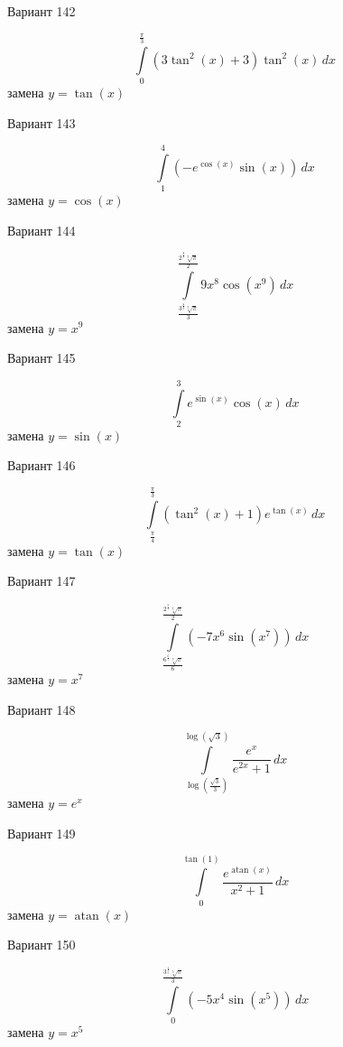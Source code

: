 \documentclass[11pt]{report}
\begin{document}
Вариант 142

$$\int\limits_{0}^{\frac{\pi}{3}} \left(3 \tan^{2}{\left(x \right)} + 3\right) \tan^{2}{\left(x \right)}\, dx$$
замена $y = \tan{\left(x \right)}$

Вариант 143

$$\int\limits_{1}^{4} \left(- e^{\cos{\left(x \right)}} \sin{\left(x \right)}\right)\, dx$$
замена $y = \cos{\left(x \right)}$

Вариант 144

$$\int\limits_{\frac{3^{\frac{8}{9}} \sqrt[9]{\pi}}{3}}^{\frac{2^{\frac{8}{9}} \sqrt[9]{\pi}}{2}} 9 x^{8} \cos{\left(x^{9} \right)}\, dx$$
замена $y = x^{9}$

Вариант 145

$$\int\limits_{2}^{3} e^{\sin{\left(x \right)}} \cos{\left(x \right)}\, dx$$
замена $y = \sin{\left(x \right)}$

Вариант 146

$$\int\limits_{\frac{\pi}{4}}^{\frac{\pi}{3}} \left(\tan^{2}{\left(x \right)} + 1\right) e^{\tan{\left(x \right)}}\, dx$$
замена $y = \tan{\left(x \right)}$

Вариант 147

$$\int\limits_{\frac{6^{\frac{6}{7}} \sqrt[7]{\pi}}{6}}^{\frac{2^{\frac{5}{7}} \sqrt[7]{\pi}}{2}} \left(- 7 x^{6} \sin{\left(x^{7} \right)}\right)\, dx$$
замена $y = x^{7}$

Вариант 148

$$\int\limits_{\log{\left(\frac{\sqrt{3}}{3} \right)}}^{\log{\left(\sqrt{3} \right)}} \frac{e^{x}}{e^{2 x} + 1}\, dx$$
замена $y = e^{x}$

Вариант 149

$$\int\limits_{0}^{\tan{\left(1 \right)}} \frac{e^{\operatorname{atan}{\left(x \right)}}}{x^{2} + 1}\, dx$$
замена $y = \operatorname{atan}{\left(x \right)}$

Вариант 150

$$\int\limits_{0}^{\frac{3^{\frac{4}{5}} \sqrt[5]{\pi}}{3}} \left(- 5 x^{4} \sin{\left(x^{5} \right)}\right)\, dx$$
замена $y = x^{5}$
\end{document}
